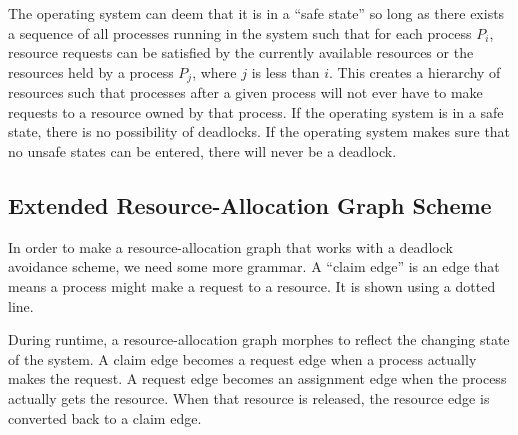\documentclass{article}
\begin{document}
The operating system can deem that it is in a ``safe state'' so long as there
exists a sequence of all processes running in the system such that for each
process $P_i$, resource requests can be satisfied by the currently available
resources or the resources held by a process $P_j$, where $j$ is less than
$i$. This creates a hierarchy of resources such that processes after a given
process will not ever have to make requests to a resource owned by that
process. If the operating system is in a safe state, there is no possibility of
deadlocks. If the operating system makes sure that no unsafe states can be
entered, there will never be a deadlock.

\subsection{Extended Resource-Allocation Graph Scheme}
In order to make a resource-allocation graph that works with a deadlock
avoidance scheme, we need some more grammar. A ``claim edge'' is an edge that
means a process might make a request to a resource. It is shown using a dotted
line.

During runtime, a resource-allocation graph morphes to reflect the changing
state of the system. A claim edge becomes a request edge when a process
actually makes the request. A request edge becomes an assignment edge when the
process actually gets the resource. When that resource is released, the
resource edge is converted back to a claim edge.
\end{document}
